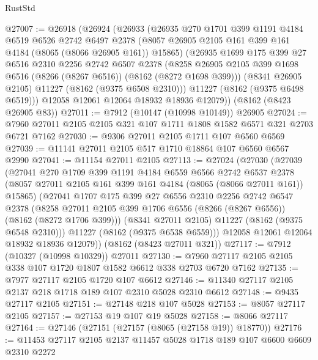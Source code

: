 \begin{lexlean}{RustStd}
\begin{coremodule}
@27007 := @26918
    (@26924
      (@26933
        (@26935
          @270
          @1701
          @399
          @1191
          @4184
          @6519
          @6526
          @2742
          @6497
          @2378
          (@8057 @26905 @2105 @161 @399 @161 @4184 (@8065 (@8066 @26905 @161)) @15865)
          (@26935
            @1699
            @175
            @399
            @27
            @6516
            @2310
            @2256
            @2742
            @6507
            @2378
            (@8258 @26905 @2105 @399 @1698 @6516 (@8266 (@8267 @6516)) (@8162 (@8272 @1698 @399)))
            (@8341 @26905 @2105)
            @11227
            (@8162 (@9375 @6508 @2310)))
          @11227
          (@8162 (@9375 @6498 @6519)))
        @12058
        @12061
        @12064
        @18932
        @18936
        @12079))
    (@8162 (@8423 @26905 @83))
@27011 := @7912 (@10147 (@10998 @10149)) @26905
@27024 := @7960 @27011 @2105 @2105 @321 @107 @1711 @1808 @1582 @6571 @321 @2703 @6721 @7162
@27030 := @9306 @27011 @2105 @1711 @107 @6560 @6569
@27039 := @11141 @27011 @2105 @517 @1710 @18864 @107 @6560 @6567 @2990
@27041 := @11154 @27011 @2105
@27113 := @27024
    (@27030
      (@27039
        (@27041
          @270
          @1709
          @399
          @1191
          @4184
          @6559
          @6566
          @2742
          @6537
          @2378
          (@8057 @27011 @2105 @161 @399 @161 @4184 (@8065 (@8066 @27011 @161)) @15865)
          (@27041
            @1707
            @175
            @399
            @27
            @6556
            @2310
            @2256
            @2742
            @6547
            @2378
            (@8258 @27011 @2105 @399 @1706 @6556 (@8266 (@8267 @6556)) (@8162 (@8272 @1706 @399)))
            (@8341 @27011 @2105)
            @11227
            (@8162 (@9375 @6548 @2310)))
          @11227
          (@8162 (@9375 @6538 @6559)))
        @12058
        @12061
        @12064
        @18932
        @18936
        @12079))
    (@8162 (@8423 @27011 @321))
@27117 := @7912 (@10327 (@10998 @10329)) @27011
@27130 := @7960 @27117 @2105 @2105 @338 @107 @1720 @1807 @1582 @6612 @338 @2703 @6720 @7162
@27135 := @7977 @27117 @2105 @1720 @107 @6612
@27146 := @11340 @27117 @2105 @2137 @218 @1718 @189 @107 @2310 @5028 @2310 @6612
@27148 := @9435 @27117 @2105
@27151 := @27148 @218 @107 @5028
@27153 := @8057 @27117 @2105
@27157 := @27153 @19 @107 @19 @5028
@27158 := @8066 @27117
@27164 := @27146 (@27151 (@27157 (@8065 (@27158 @19)) @18770))
@27176 := @11453 @27117 @2105 @2137 @11457 @5028 @1718 @189 @107 @6600 @6609 @2310 @2272

\end{coremodule}
\end{lexlean}
